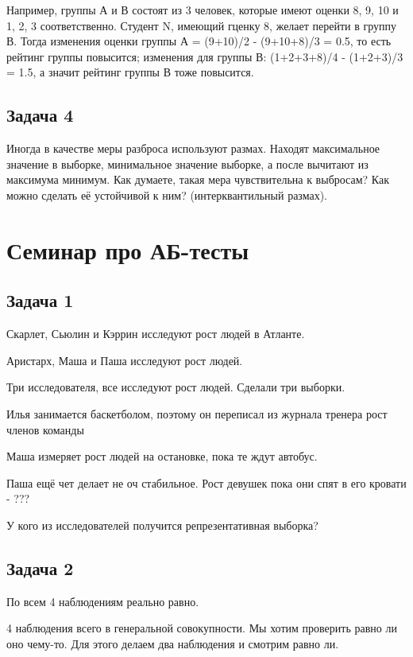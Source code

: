 \documentclass[12pt, a4paper, oneside]{article}
\begin{document}
Например, группы А и В состоят из 3 человек, которые имеют оценки 8, 9, 10 и 1, 2, 3 соответственно. Студент N, имеющий гценку 8, желает перейти в группу В. Тогда изменения оценки группы А = (9+10)/2 - (9+10+8)/3 = 0.5, то есть рейтинг группы повысится; изменения для группы В: (1+2+3+8)/4 - (1+2+3)/3 = 1.5, а значит рейтинг группы В тоже повысится.


\subsection*{Задача 4} 

Иногда в качестве меры разброса используют размах. Находят максимальное значение в выборке, минимальное значение выборке, а после вычитают из максимума минимум. Как думаете, такая мера чувствительна к выбросам? Как можно сделать её устойчивой к ним? (интерквантильный размах).


\newpage

\section*{Семинар про АБ-тесты }

\subsection*{Задача 1} 

Скарлет, Сьюлин и Кэррин исследуют рост людей в Атланте. 

Аристарх,  Маша и Паша исследуют рост людей. 

Три исследователя, все исследуют рост людей. Сделали три выборки. 

Илья занимается баскетболом, поэтому он переписал из журнала тренера рост членов команды

Маша измеряет рост людей на остановке, пока те ждут автобус. 

Паша ещё чет делает не оч стабильное. Рост девушек пока они спят в его кровати - ???


У кого из исследователей получится репрезентативная выборка? 





\subsection*{Задача 2} 

По всем 4 наблюдениям реально равно. 

4 наблюдения всего в генеральной совокупности.  Мы хотим проверить равно ли оно чему-то.  Для этого делаем два наблюдения и смотрим равно ли. 
\end{document}
